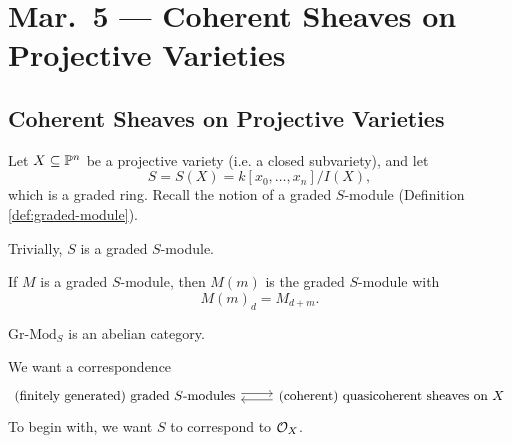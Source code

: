 \chapter{Mar.~5 --- Coherent Sheaves on Projective Varieties}

\section{Coherent Sheaves on Projective Varieties}

\begin{remark}
  Let $X \subseteq \mathbb{P}^n$ be a projective
  variety (i.e. a closed subvariety), and
  let \[S = S(X) = k[x_0, \dots, x_n] / I(X),\]
  which is a graded ring.
  Recall the notion of a graded $S$-module
  (Definition \ref{def:graded-module}).
\end{remark}

\begin{example}
  Trivially, $S$ is a graded $S$-module.
\end{example}

\begin{example}
  If $M$ is a graded $S$-module, then
  $M(m)$ is the graded $S$-module with
  \[
    M(m)_d = M_{d + m}.
  \]
\end{example}

\begin{remark}
  $\mathrm{Gr}\text{-}\mathrm{Mod}_S$
  is an abelian category.
\end{remark}

\begin{remark}
  We want a correspondence
  \[
    \begin{tikzcd}
    \text{(finitely generated) graded $S$-modules}
    \ar[r, shift left = 1] & \text{(coherent) quasicoherent sheaves on $X$} \ar[l, shift left = 1]
    \end{tikzcd}
  \]
  To begin with, we want $S$ to correspond
  to $\mathcal{O}_X$.
\end{remark}

